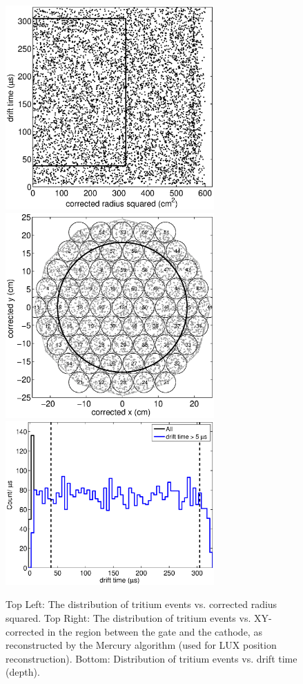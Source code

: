 \begin{figure}[H]\centering
\includegraphics[width=80mm]{CH3T_RZ_scatter_lux10_20130812T1546.eps}
\includegraphics[width=80mm]{CH3T_XY_scatter_PMT_lux10_20130812T1546.eps}
\includegraphics[width=80mm]{CH3T_Z_density_lux10_20130812T1546.eps}
\caption{Top Left: The distribution of tritium events vs. corrected radius squared. Top Right: The distribution of tritium events vs. XY-corrected in the region between the gate and the cathode, as reconstructed by the Mercury algorithm (used for LUX position reconstruction). Bottom: Distribution of tritium events vs. drift time (depth).}
\label{fig:Density}
\end{figure}

